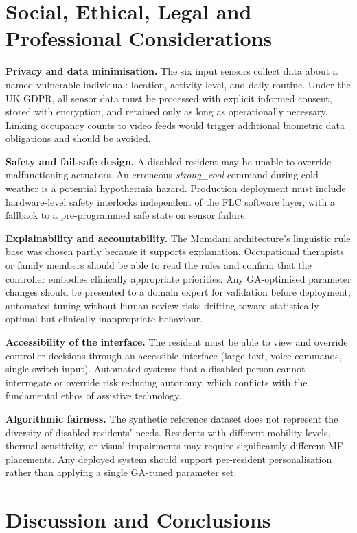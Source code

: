 \documentclass[10pt,twocolumn,a4paper]{article}
\begin{document}
\section{Social, Ethical, Legal and Professional Considerations}
\label{sec:ethics}

\textbf{Privacy and data minimisation.} The six input sensors collect data about a named vulnerable individual: location, activity level, and daily routine. Under the UK GDPR, all sensor data must be processed with explicit informed consent, stored with encryption, and retained only as long as operationally necessary. Linking occupancy counts to video feeds would trigger additional biometric data obligations and should be avoided.

\textbf{Safety and fail-safe design.} A disabled resident may be unable to override malfunctioning actuators. An erroneous \textit{strong\_cool} command during cold weather is a potential hypothermia hazard. Production deployment must include hardware-level safety interlocks independent of the FLC software layer, with a fallback to a pre-programmed safe state on sensor failure.

\textbf{Explainability and accountability.} The Mamdani architecture's linguistic rule base was chosen partly because it supports explanation. Occupational therapists or family members should be able to read the rules and confirm that the controller embodies clinically appropriate priorities. Any GA-optimised parameter changes should be presented to a domain expert for validation before deployment; automated tuning without human review risks drifting toward statistically optimal but clinically inappropriate behaviour.

\textbf{Accessibility of the interface.} The resident must be able to view and override controller decisions through an accessible interface (large text, voice commands, single-switch input). Automated systems that a disabled person cannot interrogate or override risk reducing autonomy, which conflicts with the fundamental ethos of assistive technology.

\textbf{Algorithmic fairness.} The synthetic reference dataset does not represent the diversity of disabled residents' needs. Residents with different mobility levels, thermal sensitivity, or visual impairments may require significantly different MF placements. Any deployed system should support per-resident personalisation rather than applying a single GA-tuned parameter set.

\section{Discussion and Conclusions}
\label{sec:conclusion}
\end{document}
